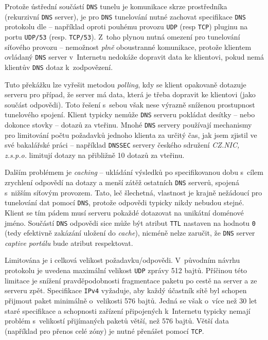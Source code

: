\documentclass[thesis=M,czech]{FITthesis}[2012/10/20]
\begin{document}
    Protože ústřední součástí \texttt{DNS} tunelu je komunikace skrze prostředníka (rekurzivní \texttt{DNS} server), je pro \texttt{DNS} tunelování nutné zachovat specifikace \texttt{DNS} protokolu dle \cite[RFC 1035]{rfc1035} -- například oproti pouhému provozu \texttt{UDP} (resp \texttt{TCP}) pluginu na portu \texttt{UDP/53} (resp. \texttt{TCP/53}). Z~toho plynou nutná omezení pro tunelování síťového provozu -- nemožnost \textit{plně} oboustranné komunikace, protože klientem ovládaný \texttt{DNS} server v~Internetu nedokáže dopravit data ke klientovi, pokud nemá klientův \texttt{DNS} dotaz k~zodpovězení.
    
    Tuto překážku lze vyřešit metodou \textit{polling}, kdy se klient opakovaně dotazuje serveru pro případ, že server má data, která je třeba dopravit ke klientovi (jako součást odpovědi). Toto řešení s~sebou však nese výrazně sníženou prostupnost tunelového spojení. Klient typicky nemůže \texttt{DNS} serveru pokládat desítky -- nebo dokonce stovky -- dotazů za vteřinu. Mnohé \texttt{DNS} servery používají mechanismy pro limitování počtu požadavků jednoho klienta za určitý čas, jak jsem zjistil ve své bakalářské práci \cite{moje-bakalarka} -- například \texttt{DNSSEC} servery českého sdružení \textit{CZ.NIC, z.s.p.o.}\cite{cznic-dnssec} limitují dotazy na přibližně 10 dotazů za vteřinu.
    
    Dalším problémem je \textit{caching} -- ukládání výsledků po specifikovanou dobu s~cílem zrychlení odpovědí na dotazy a menší zátěž ostatních \texttt{DNS} serverů, spojená s~nižším síťovým provozem. Tato, leč šlechetná, vlastnost je krajně nežádoucí pro tunelování dat pomocí \texttt{DNS}, protože odpovědi typicky nikdy nebudou stejné. Klient se tím pádem musí serveru pokaždé dotazovat na unikátní doménové jméno. Součástí \texttt{DNS} odpovědi sice může být atribut \texttt{TTL} nastaven na hodnotu \texttt{0} (tedy efektivně zakázání uložení do \textit{cache}), nicméně nelze zaručit, že \texttt{DNS} server \textit{captive portálu} bude atribut respektovat.
    
    Limitována je i celková velikost požadavku/odpovědi. V~původním návrhu protokolu \cite[RFC 1035]{rfc1035} je uvedena maximální velikost \texttt{UDP} zprávy 512 bajtů. Příčinou této limitace je snížení pravděpodobnosti fragmentace paketu po cestě na server a ze serveru zpět. Specifikace \texttt{IPv4} \cite[RFC 791]{rfc791} vyžaduje, aby každý účastník sítě byl schopen přijmout paket minimálně o~velikosti 576 bajtů. Jedná se však o~více než 30 let staré specifikace a schopnosti zařízení připojených k~Internetu typicky nemají problém s~velikostí přijímaných paketů větší, než 576 bajtů. Větší data (například pro přenos celé zóny) je nutné přenášet pomocí \texttt{TCP}.
    
\end{document}
